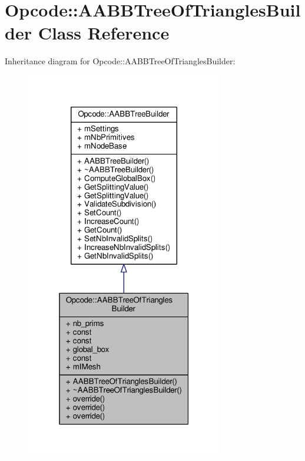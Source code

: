 \hypertarget{classOpcode_1_1AABBTreeOfTrianglesBuilder}{}\section{Opcode\+:\+:A\+A\+B\+B\+Tree\+Of\+Triangles\+Builder Class Reference}
\label{classOpcode_1_1AABBTreeOfTrianglesBuilder}


Inheritance diagram for Opcode\+:\+:A\+A\+B\+B\+Tree\+Of\+Triangles\+Builder\+:
\nopagebreak
\begin{figure}[H]
\begin{center}
\leavevmode
\includegraphics[width=244pt]{de/da7/classOpcode_1_1AABBTreeOfTrianglesBuilder__inherit__graph}
\end{center}
\end{figure}


